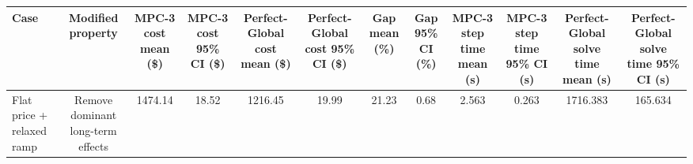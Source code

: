 \begin{tabular}{lccccccccccc}
\toprule
Case & Modified property & MPC-3 cost mean (\$) & MPC-3 cost 95\% CI (\$) & Perfect-Global cost mean (\$) & Perfect-Global cost 95\% CI (\$) & Gap mean (\%) & Gap 95\% CI (\%) & MPC-3 step time mean (s) & MPC-3 step time 95\% CI (s) & Perfect-Global solve time mean (s) & Perfect-Global solve time 95\% CI (s) \\
\midrule
Flat price + relaxed ramp & Remove dominant long-term effects & 1474.14 & 18.52 & 1216.45 & 19.99 & 21.23 & 0.68 & 2.563 & 0.263 & 1716.383 & 165.634 \\
\bottomrule
\end{tabular}
